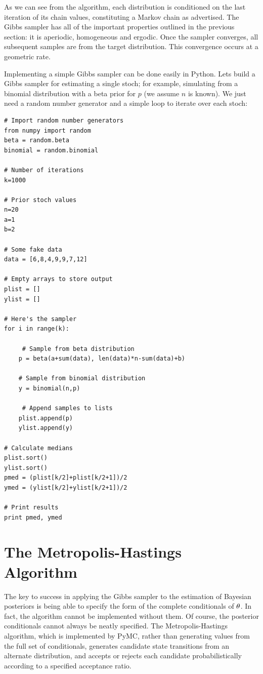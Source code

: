 \documentclass[]{book}
\begin{document}
As we can see from the algorithm, each distribution is conditioned on the last iteration of its chain values, constituting a Markov chain as advertised. The Gibbs sampler has all of the important properties outlined in the previous section: it is aperiodic, homogeneous and ergodic. Once the sampler converges, all subsequent samples are from the target distribution. This convergence occurs at a geometric rate.

Implementing a simple Gibbs sampler can be done easily in Python. Lets build a Gibbs sampler for estimating a single stoch; for example, simulating from a binomial distribution with a beta prior for $p$ (we assume $n$ is known). We just need a random number generator and a simple loop to iterate over each stoch:
\vspace{1cm}
\begin{verbatim}
# Import random number generators
from numpy import random
beta = random.beta
binomial = random.binomial

# Number of iterations
k=1000

# Prior stoch values
n=20
a=1
b=2

# Some fake data
data = [6,8,4,9,9,7,12]

# Empty arrays to store output
plist = []
ylist = []

# Here's the sampler
for i in range(k):

     # Sample from beta distribution
    p = beta(a+sum(data), len(data)*n-sum(data)+b)

    # Sample from binomial distribution
    y = binomial(n,p)

     # Append samples to lists
    plist.append(p)
    ylist.append(y)

# Calculate medians
plist.sort()
ylist.sort()
pmed = (plist[k/2]+plist[k/2+1])/2
ymed = (ylist[k/2]+ylist[k/2+1])/2

# Print results
print pmed, ymed
\end{verbatim}
\vspace{1cm}

\section{The Metropolis-Hastings Algorithm}

The key to success in applying the Gibbs sampler to the estimation of Bayesian posteriors is being able to specify the form of the complete conditionals of ${\bf \theta}$. In fact, the algorithm cannot be implemented without them. Of course, the posterior conditionals cannot always be neatly specified. The Metropolis-Hastings algorithm, which is implemented by PyMC, rather than generating values from the full set of conditionals, generates candidate state transitions from an alternate distribution, and accepts or rejects each candidate probabilistically according to a specified acceptance ratio.
\end{document}
